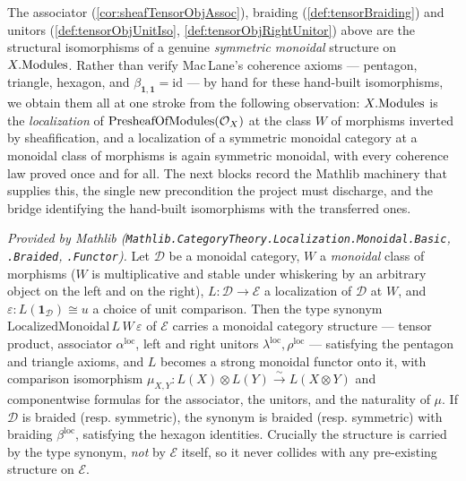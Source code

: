 The associator (\cref{cor:sheafTensorObjAssoc}), braiding (\cref{def:tensorBraiding})
and unitors (\cref{def:tensorObjUnitIso}, \cref{def:tensorObjRightUnitor}) above are
the structural isomorphisms of a genuine \emph{symmetric monoidal} structure on
\(X.\mathrm{Modules}\). Rather than verify Mac\,Lane's coherence axioms --- pentagon,
triangle, hexagon, and \(\beta_{\mathbf{1},\mathbf{1}} = \mathrm{id}\) --- by hand
for these hand-built isomorphisms, we obtain them all at one stroke from the
following observation: \(X.\mathrm{Modules}\) is the \emph{localization} of
\(\mathrm{PresheafOfModules}(\mathcal{O}_X)\) at the class \(W\) of morphisms inverted by
sheafification, and a localization of a symmetric monoidal category at a
monoidal class of morphisms is again symmetric monoidal, with every coherence law
proved once and for all. The next blocks record the Mathlib machinery that supplies
this, the single new precondition the project must discharge, and the bridge
identifying the hand-built isomorphisms with the transferred ones.

\begin{theorem}
  \label{thm:localizedMonoidal_mathlib}
  \mathlibok
  \textit{Provided by Mathlib
  (\texttt{Mathlib.CategoryTheory.Localization.Monoidal.Basic},
  \texttt{.Braided}, \texttt{.Functor}).}
  Let \(\mathcal{D}\) be a monoidal category, \(W\) a \emph{monoidal} class of
  morphisms (\(W\) is
  multiplicative and stable under whiskering by an arbitrary object on the left
  and on the right), \(L : \mathcal{D} \to \mathcal{E}\) a localization of
  \(\mathcal{D}\) at \(W\), and \(\varepsilon : L(\mathbf{1}_{\mathcal{D}}) \cong u\)
  a choice of unit comparison. Then the type synonym
  \(\mathrm{LocalizedMonoidal}\,L\,W\,\varepsilon\) of \(\mathcal{E}\) carries a
  monoidal category structure --- tensor product, associator
  \(\alpha^{\mathrm{loc}}\), left and right unitors
  \(\lambda^{\mathrm{loc}}, \rho^{\mathrm{loc}}\) --- satisfying the pentagon and
  triangle axioms, and \(L\) becomes a strong monoidal functor onto it,
  with comparison isomorphism
  \(\mu_{X,Y} : L(X) \otimes L(Y) \xrightarrow{\sim} L(X \otimes Y)\) and
  componentwise formulas for the associator, the unitors, and the naturality of
  \(\mu\). If \(\mathcal{D}\) is braided (resp. symmetric), the
  synonym is braided (resp. symmetric) with braiding \(\beta^{\mathrm{loc}}\),
  satisfying the hexagon identities. Crucially the
  structure is carried by the type synonym, \emph{not} by \(\mathcal{E}\) itself,
  so it never collides with any pre-existing structure on \(\mathcal{E}\).
\end{theorem}

